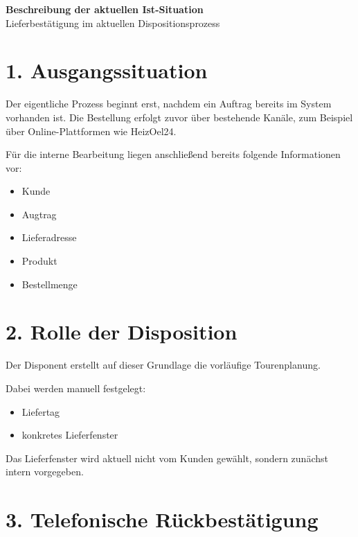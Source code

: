 \documentclass[a4paper,11pt]{article}
\begin{document}
	
	\begin{center}
		{\Large \textbf{Beschreibung der aktuellen Ist-Situation}}\\[0.3cm]
		{\normalsize Lieferbestätigung im aktuellen Dispositionsprozess}
	\end{center}
	
	\vspace{0.8cm}
	
	\section*{1. Ausgangssituation}
	
	Der eigentliche Prozess beginnt erst, nachdem ein Auftrag bereits im System vorhanden ist.
	Die Bestellung erfolgt zuvor über bestehende Kanäle, zum Beispiel über Online-Plattformen wie HeizOel24.
	
	Für die interne Bearbeitung liegen anschließend bereits folgende Informationen vor:
	
	\begin{itemize}[leftmargin=1.2cm]
		\item Kunde
		\item Augtrag
		\item Lieferadresse
		\item Produkt
		\item Bestellmenge
	\end{itemize}
	
	\section*{2. Rolle der Disposition}
	
	Der Disponent erstellt auf dieser Grundlage die vorläufige Tourenplanung.
	
	Dabei werden manuell festgelegt:
	
	\begin{itemize}[leftmargin=1.2cm]
		\item Liefertag
		\item konkretes Lieferfenster
	\end{itemize}
	
	Das Lieferfenster wird aktuell nicht vom Kunden gewählt, sondern zunächst intern vorgegeben.
	
	\section*{3. Telefonische Rückbestätigung}
	
\end{document}
